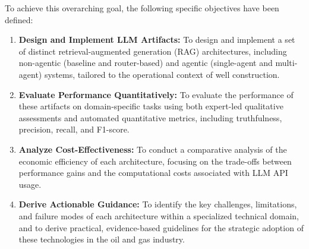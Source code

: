     To achieve this overarching goal, the following specific objectives have been defined:

    \begin{enumerate}
        \item \textbf{Design and Implement LLM Artifacts:} To design and implement a set of distinct retrieval-augmented generation (RAG)
        architectures, including non-agentic (baseline and router-based) and agentic (single-agent and multi-agent) systems, tailored to the operational context of well construction.

        \item \textbf{Evaluate Performance Quantitatively:} To evaluate the performance of these artifacts on domain-specific tasks using both expert-led qualitative assessments and automated quantitative metrics, including truthfulness, precision, recall, and F1-score.

        \item \textbf{Analyze Cost-Effectiveness:} To conduct a comparative analysis of the economic efficiency of each architecture, focusing on the trade-offs between performance gains and the computational costs associated with LLM API usage.

        \item \textbf{Derive Actionable Guidance:} To identify the key challenges, limitations, and failure modes of each architecture within a specialized technical domain, and to derive practical, evidence-based guidelines for the strategic adoption of these technologies in the oil and gas industry.
    \end{enumerate}

    
    
